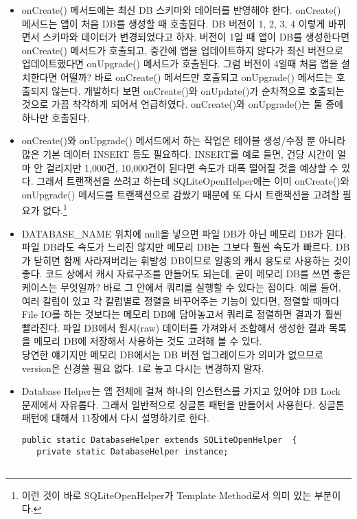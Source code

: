 \begin{itemize}
\item onCreate() 메서드에는 최신 DB 스키마와 데이터를 반영해야 한다. onCreate() 메서드는 앱이 처음 DB를 생성할 때 호출된다. DB 버전이 1, 2, 3, 4 이렇게 바뀌면서 스키마와 데이터가 변경되었다고 하자. 버전이 1일 때 앱이 DB를 생성한다면 onCreate() 메서드가 호출되고, 중간에 앱을 업데이트하지 않다가 최신 버전으로 업데이트했다면 onUpgrade() 메서드가 호출된다.
그럼 버전이 4일때 처음 앱을 설치한다면 어떨까? 바로 onCreate() 메서드만 호출되고 onUpgrade() 메서드는 호출되지 않는다. 
개발하다 보면 onCreate()와 onUpdate()가 순차적으로 호출되는 것으로 가끔 착각하게 되어서 언급하였다. onCreate()와 onUpgrade()는 둘 중에 하나만 호출된다.

\item onCreate()와 onUpgrade() 메서드에서 하는 작업은 테이블 생성/수정 뿐 아니라 많은 기본 데이터 INSERT 등도 필요하다. INSERT를 예로 들면, 건당 시간이 얼마 안 걸리지만 1,000건, 10,000건이 된다면 속도가 대폭 떨어질 것을 예상할 수 있다.
그래서 트랜잭션을 쓰려고 하는데 SQLiteOpenHelper에는 이미 onCreate()와 onUpgrade() 메서드를 트랜잭션으로 감쌌기 때문에 또 다시 트랜잭션을 고려할 필요가 없다.\footnote{이런 것이 바로 SQLiteOpenHelper가 Template Method로서 의미 있는 부분이다.}

\item DATABASE\_NAME 위치에 null을 넣으면 파일 DB가 아닌 메모리 DB가 된다. 파일 DB라도 속도가 느리진 않지만 메모리 DB는 그보다 훨씬 속도가 빠르다. DB가 닫히면 함께 사라져버리는 휘발성 DB이므로 일종의 캐시 용도로 사용하는 것이 좋다.
코드 상에서 캐시 자료구조를 만들어도 되는데, 굳이 메모리 DB를 쓰면 좋은 케이스는 무엇일까? 바로 그 안에서 쿼리를 실행할 수 있다는 점이다.
예를 들어, 여러 칼럼이 있고 각 칼럼별로 정렬을 바꾸어주는 기능이 있다면, 정렬할 때마다 File IO를 하는 것보다는 메모리 DB에 담아놓고서 쿼리로 정렬하면 결과가 훨씬 빨라진다. 
파일 DB에서 원시(raw) 데이터를 가져와서 조합해서 생성한 결과 목록을 메모리 DB에 저장해서 사용하는 것도 고려해 볼 수 있다.\\

당연한 얘기지만 메모리 DB에서는 DB 버전 업그레이드가 의미가 없으므로 version은 신경쓸 필요 없다. 1로 놓고 다시는 변경하지 말자.

\item Database Helper는 앱 전체에 걸쳐 하나의 인스턴스를 가지고 있어야 DB Lock 문제에서 자유롭다. 
그래서 일반적으로 싱글톤 패턴을 만들어서 사용한다. 싱글톤 패턴에 대해서 11장에서 다시 설명하기로 한다.

\begin{lstlisting}[frame=single] 
public static DatabaseHelper extends SQLiteOpenHelper  {
   private static DatabaseHelper instance;
 

\end{lstlisting}
\end{itemize}
